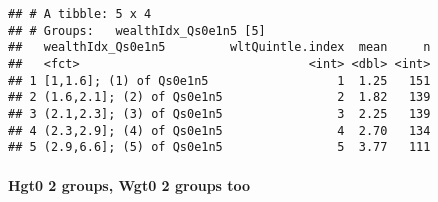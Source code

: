 \documentclass[
]{book}
\newenvironment{Shaded}{\begin{snugshade}}{\end{snugshade}}
\newcommand{\CommentTok}[1]{\textcolor[rgb]{0.56,0.35,0.01}{\textit{#1}}}
\newcommand{\DataTypeTok}[1]{\textcolor[rgb]{0.13,0.29,0.53}{#1}}
\newcommand{\DecValTok}[1]{\textcolor[rgb]{0.00,0.00,0.81}{#1}}
\newcommand{\FloatTok}[1]{\textcolor[rgb]{0.00,0.00,0.81}{#1}}
\newcommand{\KeywordTok}[1]{\textcolor[rgb]{0.13,0.29,0.53}{\textbf{#1}}}
\newcommand{\NormalTok}[1]{#1}
\newcommand{\OperatorTok}[1]{\textcolor[rgb]{0.81,0.36,0.00}{\textbf{#1}}}
\newcommand{\OtherTok}[1]{\textcolor[rgb]{0.56,0.35,0.01}{#1}}
\newcommand{\StringTok}[1]{\textcolor[rgb]{0.31,0.60,0.02}{#1}}
\begin{document}
\begin{Shaded}
\end{Shaded}

\begin{verbatim}
## # A tibble: 5 x 4
## # Groups:   wealthIdx_Qs0e1n5 [5]
##   wealthIdx_Qs0e1n5         wltQuintle.index  mean     n
##   <fct>                                <int> <dbl> <int>
## 1 [1,1.6]; (1) of Qs0e1n5                  1  1.25   151
## 2 (1.6,2.1]; (2) of Qs0e1n5                2  1.82   139
## 3 (2.1,2.3]; (3) of Qs0e1n5                3  2.25   139
## 4 (2.3,2.9]; (4) of Qs0e1n5                4  2.70   134
## 5 (2.9,6.6]; (5) of Qs0e1n5                5  3.77   111
\end{verbatim}

\hypertarget{hgt0-2-groups-wgt0-2-groups-too}{%
\paragraph{Hgt0 2 groups, Wgt0 2 groups too}\label{hgt0-2-groups-wgt0-2-groups-too}}
\end{document}
